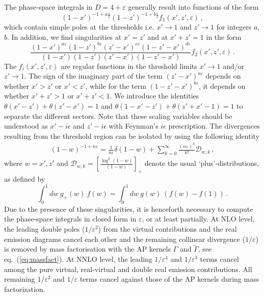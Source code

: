 \documentclass[%
 twocolumn,
 superscriptaddress,
 preprintnumbers,
 nofootinbib,
 amsmath,amssymb,
 aps,
 prl,
]{revtex4}
\begin{document}
The phase-space integrals in $D=4+\varepsilon$ generally result into functions of the form 
%
$$
(1-x')^{-1 + a \frac{\varepsilon}{2}} (1-z')^{-1 + b \frac{\varepsilon}{2}} f_1(x',z',\varepsilon)
\, ,
$$ 
%
which contain simple poles at the thresholds i.e. $x' \rightarrow 1$ and $z' \rightarrow 1$ for 
integers $a$, $b$.
In addition, we find  singularities at $x'=z'$ and at $x'+z'=1$ in the form
%
$$
\frac{(1-x')^{a \varepsilon}   (1-z')^{b \varepsilon}(z'-x')^{c \varepsilon}(1-z'-x')^{d \varepsilon} }{(1-x') (1-z')(z'-x')(1-z'-x')} f_2(x',z',\varepsilon)
\, .
$$
%
The $f_i(x',z',\varepsilon)$ are regular functions in the threshold limits $x'\rightarrow 1$ and/or $z'\rightarrow 1$. 
The sign of the imaginary part of the term $(z'-x')^{a \varepsilon}$ depends on whether $x'>z'$ or $x'<z'$,
while for the term $(1-z'-x')^{b \varepsilon}$, it depends on whether $x'+z'>1$ or $x'+z'<1$.   We introduce the identities $\theta(x'-z')+\theta(z'-x')=1$ and $\theta(1-x'-z')+
\theta(z'+x'-1)=1$ to separate the different sectors.
Note that these scaling variables should be understood as $x'-i\epsilon$ and $z'-i\epsilon$ with Feynman's $i\epsilon$ prescription.
% 
The divergences resulting from the threshold region can be isolated by using the following identity
%
\begin{align}
(1-w)^{-1 + n \varepsilon} = \frac{1}{n \varepsilon} \delta(1-w) + \sum_{k=0}^\infty \frac{(n \varepsilon)^k}{k!}  \mathcal{D}_{w,k} \,,
\end{align}
%
where $w=x',z'$ and 
$\mathcal{D}_{w,k} = \left[ \frac{\log^k (1-w)}{(1-w)} \right]_+$
denote the usual `plus'-distributions, as defined by
%
\begin{equation}
 \int_0^1 dw ~ g_+(w) ~ f(w) = \int_0^1 dw ~ g(w) ~ (f(w)-f(1)) 
 \, .
\end{equation}
% 
Due to the presence of these singularities, it is henceforth necessary to compute the phase-space 
integrals in closed form in $\varepsilon$, or at least partially. 
% 
At NLO level, the leading double poles ($1/\varepsilon^2$) from the virtual contributions and the real emission diagrams  
cancel each other and the remaining collinear divergence ($1/\varepsilon$) is removed by mass factorisation with the AP kernels $\Gamma$ and $\tilde \Gamma$, see eq.~(\ref{eq:massfact}).  
At NNLO level, the leading $1/\varepsilon^4$ and $1/\varepsilon^3$ terms cancel among
the pure virtual, real-virtual and double real emission contributions.  
All remaining $1/\varepsilon^2$ and $1/\varepsilon$ terms cancel against those of the AP kernels during mass factorization.
\end{document}
